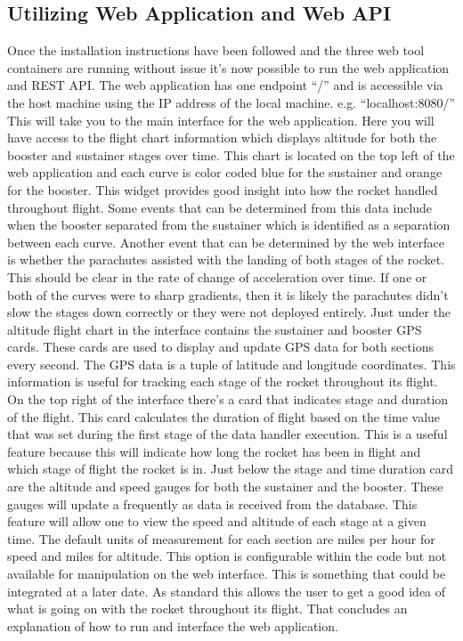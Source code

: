 \documentclass[onecolumn, draftclsnofoot,10pt, compsoc]{IEEEtran}
\begin{document}
\subsection{Utilizing Web Application and Web API}
Once the installation instructions have been followed and the three web tool containers are running without issue it’s now possible to run the web application and REST API. The web application has one endpoint “/” and is accessible via the host machine using the IP address of the local machine. e.g. “localhost:8080/” This will take you to the main interface for the web application. Here you will have access to the flight chart information which displays altitude for both the booster and sustainer stages over time. This chart is located on the top left of the web application and each curve is color coded blue for the sustainer and orange for the booster. This widget provides good insight into how the rocket handled throughout flight. Some events that can be determined from this data include when the booster separated from the sustainer which is identified as a separation between each curve. Another event that can be determined by the web interface is whether the parachutes assisted with the landing of both stages of the rocket. This should be clear in the rate of change of acceleration over time. If one or both of the curves were to sharp gradients, then it is likely the parachutes didn’t slow the stages down correctly or they were not deployed entirely. Just under the altitude flight chart in the interface contains the sustainer and booster GPS cards. These cards are used to display and update GPS data for both sections every second. The GPS data is a tuple of latitude and longitude coordinates. This information is useful for tracking each stage of the rocket throughout its flight. On the top right of the interface there’s a card that indicates stage and duration of the flight. This card calculates the duration of flight based on the time value that was set during the first stage of the data handler execution. This is a useful feature because this will indicate how long the rocket has been in flight and which stage of flight the rocket is in. Just below the stage and time duration card are the altitude and speed gauges for both the sustainer and the booster. These gauges will update a frequently as data is received from the database. This feature will allow one to view the speed and altitude of each stage at a given time. The default units of measurement for each section are miles per hour for speed and miles for altitude. This option is configurable within the code but not available for manipulation on the web interface. This is something that could be integrated at a later date. As standard this allows the user to get a good idea of what is going on with the rocket throughout its flight. That concludes an explanation of how to run and interface the web application. \par
\end{document}
